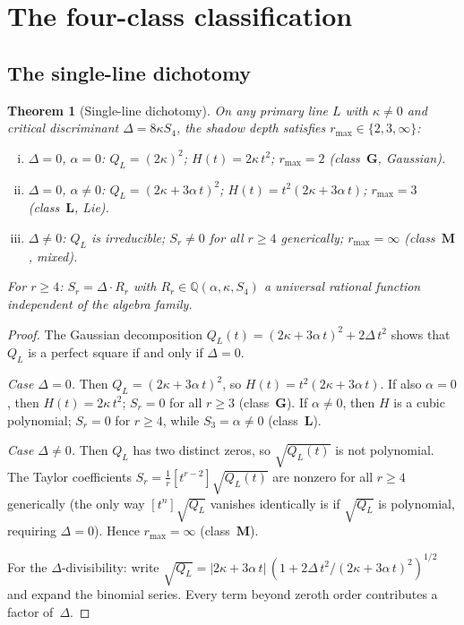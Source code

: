 \documentclass[11pt,reqno]{amsart}
\newtheorem{theorem}{Theorem}[section]
\theoremstyle{definition}
\theoremstyle{remark}
\numberwithin{equation}{section}
\begin{document}
\section{The four-class classification}\label{sec:class}

\subsection{The single-line dichotomy}
\label{subsec:single-line}

\begin{theorem}[Single-line
dichotomy]\label{thm:dichotomy}
On any primary line $L$ with $\kappa \ne 0$ and critical
discriminant $\Delta = 8\kappa S_4$, the shadow depth
satisfies $r_{\max} \in \{2, 3, \infty\}$:
\begin{enumerate}[(i)]
\item $\Delta = 0$, $\alpha = 0$:
 $Q_L = (2\kappa)^2$; $H(t) = 2\kappa\, t^2$;
 $r_{\max} = 2$ (class~$\mathbf{G}$, Gaussian).
\item $\Delta = 0$, $\alpha \ne 0$:
 $Q_L = (2\kappa + 3\alpha\, t)^2$;
 $H(t) = t^2(2\kappa + 3\alpha\, t)$;
 $r_{\max} = 3$ (class~$\mathbf{L}$, Lie).
\item $\Delta \ne 0$:
 $Q_L$ is irreducible;
 $S_r \ne 0$ for all $r \ge 4$ generically;
 $r_{\max} = \infty$ (class~$\mathbf{M}$, mixed).
\end{enumerate}
For $r \ge 4$: $S_r = \Delta \cdot R_r$ with
$R_r \in \mathbb{Q}(\alpha, \kappa, S_4)$ a universal
rational function independent of the algebra family.
\end{theorem}

\begin{proof}
The Gaussian decomposition
$Q_L(t) = (2\kappa + 3\alpha\, t)^2 + 2\Delta\, t^2$
shows that $Q_L$ is a perfect square if and only if
$\Delta = 0$.

\emph{Case $\Delta = 0$.}
Then $Q_L = (2\kappa + 3\alpha\, t)^2$, so
$H(t) = t^2(2\kappa + 3\alpha\, t)$.
If also $\alpha = 0$, then $H(t) = 2\kappa\, t^2$;
$S_r = 0$ for all $r \ge 3$ (class~$\mathbf{G}$).
If $\alpha \ne 0$, then $H$ is a cubic polynomial;
$S_r = 0$ for $r \ge 4$, while $S_3 = \alpha \ne 0$
(class~$\mathbf{L}$).

\emph{Case $\Delta \ne 0$.}
Then $Q_L$ has two distinct zeros, so $\sqrt{Q_L(t)}$ is not
polynomial. The Taylor coefficients
$S_r = \frac{1}{r}[t^{r-2}]\sqrt{Q_L(t)}$ are nonzero
for all $r \ge 4$ generically (the only way
$[t^n]\sqrt{Q_L}$ vanishes identically is if $\sqrt{Q_L}$
is polynomial, requiring $\Delta = 0$). Hence
$r_{\max} = \infty$ (class~$\mathbf{M}$).

For the $\Delta$-divisibility: write
$\sqrt{Q_L} = |2\kappa + 3\alpha\, t|\,
(1 + 2\Delta\, t^2/(2\kappa + 3\alpha\, t)^2)^{1/2}$
and expand the binomial series. Every term beyond zeroth
order contributes a factor of~$\Delta$.
\end{proof}
\end{document}
